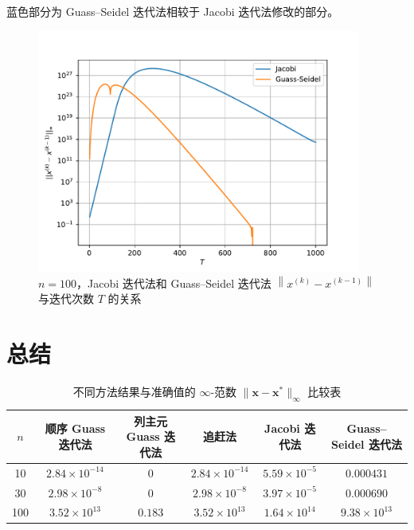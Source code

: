 \documentclass{sjtuarticle}
\begin{document}
蓝色部分为 Guass--Seidel 迭代法相较于 Jacobi 迭代法修改的部分。

\begin{figure}[h]
    \centering
    \includegraphics[height=8cm]{pic/iter.pdf}
    \caption{$n=100$，Jacobi 迭代法和 Guass--Seidel 迭代法 $\left\lVert x^{(k)}-x^{(k-1)}\right\rVert$ 与迭代次数 $T$ 的关系}
    \label{fig:iter}
\end{figure}

\section{总结}

\begin{table}[H]
    \centering
    \caption{不同方法结果与准确值的 $\infty$-范数 $\lVert \bm{x}-\bm{x}^* \rVert_\infty$ 比较表}
    \label{tab:res}
    \begin{tabular}{cccccc}
        \toprule
        $n$ & 顺序 Guass 迭代法 & 列主元 Guass 迭代法 & 追赶法 & Jacobi 迭代法 & Guass--Seidel 迭代法 \\
        \midrule
        10  & $2.84\times 10^{-14}$ & 0       & $2.84\times 10^{-14}$ & $5.59\times 10^{-5}$ & $0.000431$           \\
        30  & $2.98\times 10^{-8}$  & 0       & $2.98\times 10^{-8}$  & $3.97\times 10^{-5}$ & $0.000690$           \\
        100 & $3.52\times 10^{13}$  & $0.183$ & $3.52\times 10^{13}$  & $1.64\times 10^{14}$ & $9.38\times 10^{13}$ \\
        \bottomrule
    \end{tabular}
\end{table}
\end{document}
